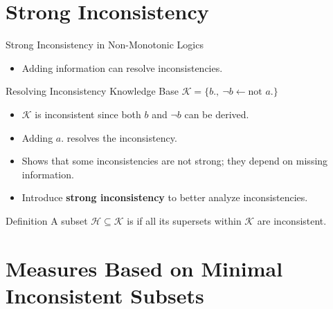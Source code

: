 \section{Strong Inconsistency}

\begin{frame}{Strong Inconsistency in Non-Monotonic Logics}
    \begin{itemize}
        \item Adding information can resolve inconsistencies.
    \end{itemize}
    \begin{exampleblock}{Resolving Inconsistency}
        Knowledge Base \( \mathcal{K} = \{ b.,\ \neg b \leftarrow \text{not }a. \} \)
        \begin{itemize}
            \item \( \mathcal{K} \) is inconsistent since both \( b \) and \( \neg b \) can be derived.
            \item Adding \( a. \) resolves the inconsistency.
            \item Shows that some inconsistencies are not strong; they depend on missing information.
        \end{itemize}
    \end{exampleblock}
    \begin{itemize}
        \item Introduce \textbf{strong inconsistency} to better analyze inconsistencies.
    \end{itemize}
    \begin{block}{Definition}
        A subset \( \mathcal{H} \subseteq \mathcal{K} \) is  if all its supersets within \( \mathcal{K} \) are inconsistent.
    \end{block}
\end{frame}

\section{Measures Based on Minimal Inconsistent Subsets}

